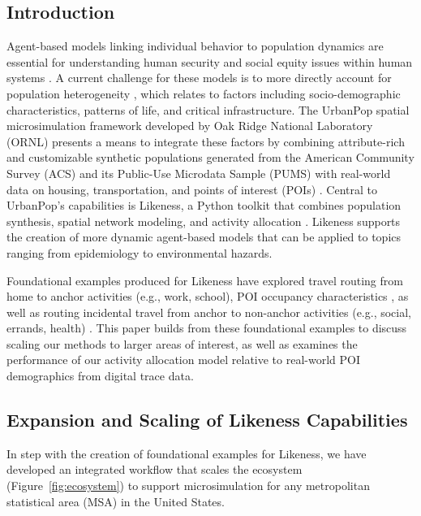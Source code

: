 \subsection{Introduction}\label{introduction}

Agent-based models linking individual behavior to population dynamics are essential for understanding human security and social equity issues within human systems \cite{germann2022assessing, ozik2021population, urbanpop-AG-2023}. A current challenge for these models is to more directly account for population heterogeneity \cite{BRaVE_DOE_2022}, which relates to factors including socio-demographic characteristics, patterns of life, and critical infrastructure. The UrbanPop spatial microsimulation framework developed by Oak Ridge National Laboratory (ORNL) presents a means to integrate these factors by combining attribute-rich and customizable synthetic populations generated from the American Community Survey (ACS) and its Public-Use Microdata Sample (PUMS) with real-world data on housing, transportation, and points of interest (POIs) \cite{urbanpop-AG-2023}. Central to UrbanPop's capabilities is Likeness, a Python toolkit that combines population synthesis, spatial network modeling, and activity allocation \cite{likeness-scipy-paper-2022, likeness-scipy-poster-2022}. Likeness supports the creation of more dynamic agent-based models that can be applied to topics ranging from epidemiology to environmental hazards. 

Foundational examples produced for Likeness have explored travel routing from home to anchor activities (e.g., work, school), POI occupancy characteristics \cite{likeness-scipy-paper-2022, likeness-scipy-poster-2022}, as well as routing incidental travel from anchor to non-anchor activities (e.g., social, errands, health) \cite{likeness_aag_2023}. This paper builds from these foundational examples to
discuss scaling our methods to larger areas of interest, as well as examines the performance of our activity allocation model relative to real-world POI demographics from digital trace data.

\subsection{Expansion and Scaling of Likeness Capabilities}\label{section:likeness-expansion-scaling}



In step with the creation of foundational examples for Likeness, we have developed an integrated workflow that scales the ecosystem (Figure~\ref{fig:ecosystem}) to support microsimulation for any metropolitan statistical area (MSA) in the United States.

